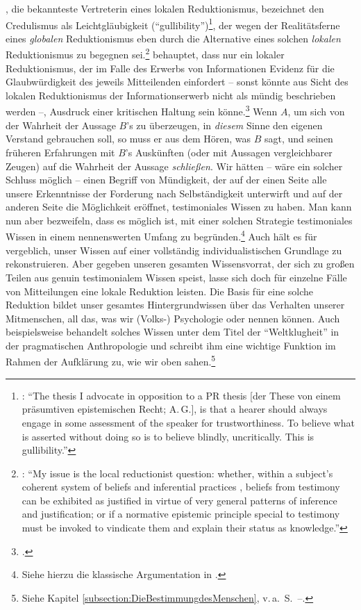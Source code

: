 , die bekannteste Vertreterin
eines lokalen Reduktionismus, bezeichnet den Credulismus als Leichtgläubigkeit
(\enquote{gullibility})\footnote{\cite[Vgl.][145]{Fricker:AgainstGullibility1994}:
\enquote{The thesis I advocate in opposition to a PR thesis [der These von einem
präsumtiven epistemischen Recht; A.\,G.], is that a hearer should always engage
in some assessment of the speaker for trustworthiness. To believe what is
asserted without doing so is to believe blindly, uncritically.
This is gullibility.}}, der wegen der Realitätsferne eines \emph{globalen}
Reduktionismus eben durch die Alternative eines solchen \emph{lokalen}
Reduktionismus zu begegnen sei.\footnote{\cite[Vgl.][136]{Fricker:AgainstGullibility1994}: \enquote{My
issue is the local reductionist question: whether, within a subject's coherent
system of beliefs and inferential practices {\punkt}, beliefs from testimony can
be exhibited as justified in virtue of very general patterns of inference and
justification; or if a normative epistemic principle special to testimony must
be invoked to vindicate them and explain their status as knowledge.}}
 behauptet, dass nur ein lokaler Reduktionismus, der
im Falle des Erwerbs von Informationen Evidenz für die Glaubwürdigkeit des
jeweils Mitteilenden einfordert -- sonst könnte aus Sicht des lokalen
Reduktionismus der Informationserwerb nicht als mündig beschrieben werden --,
Ausdruck einer kritischen Haltung sein
könne.\footnote{\cite[Vgl.][]{Fricker:AgainstGullibility1994}.} Wenn $A$, um
sich von der Wahrheit der Aussage $B$'s zu überzeugen, in \emph{diesem} Sinne
den eigenen Verstand gebrauchen soll, so muss er aus dem Hören, was $B$ sagt,
und seinen früheren Erfahrungen mit $B$'s Auskünften (oder mit Aussagen
vergleichbarer Zeugen) auf die Wahrheit der Aussage \emph{schließen}. Wir hätten
-- wäre ein solcher Schluss möglich -- einen Begriff von Mündigkeit, der auf der
einen Seite alle unsere Erkenntnisse der Forderung nach Selbständigkeit
unterwirft und auf der anderen Seite die Möglichkeit eröffnet, testimoniales
Wissen zu haben. Man kann nun aber bezweifeln, dass es möglich ist, mit einer
solchen Strategie testimoniales Wissen in einem nennenswerten Umfang zu
begründen.\footnote{Siehe hierzu die klassische Argumentation in
\cite{Anscombe:HumeandJuliusCaesar1973}.} Auch  hält es
für vergeblich, unser Wissen auf einer vollständig individualistischen Grundlage
zu rekonstruieren. Aber gegeben unseren gesamten Wissensvorrat, der sich zu
großen Teilen aus genuin testimonialem Wissen speist, lasse sich doch für
einzelne Fälle von Mitteilungen eine lokale Reduktion leisten. Die Basis für
eine solche Reduktion bildet unser gesamtes Hintergrundwissen über das Verhalten
unserer Mitmenschen, all das, was wir (Volks-) Psychologie oder
 nennen können. Auch 
beispielsweise behandelt solches Wissen unter dem Titel der
\enquote{Weltklugheit} in der pragmatischen Anthropologie und schreibt ihm eine
wichtige Funktion im Rahmen der Aufklärung zu, wie wir oben
sahen.\footnote{Siehe Kapitel \ref{subsection:DieBestimmungdesMenschen},
v.\,a.~S.~\pageref{Absatz:Weltklugheit}--\pageref{Absatz:Weltklugheit-ENDE}.}

